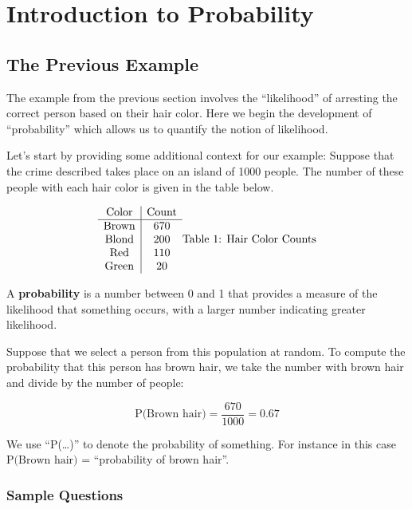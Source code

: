 \documentclass[
]{book}
\begin{document}
\hypertarget{introduction-to-probability}{%
\chapter{Introduction to Probability}\label{introduction-to-probability}}

\hypertarget{the-previous-example}{%
\section{The Previous Example}\label{the-previous-example}}

The example from the previous section involves the ``likelihood'' of arresting the
correct person based on their hair color. Here we begin the development of
``probability'' which allows us to quantify the notion of likelihood.

Let's start by providing some additional context for our example:
Suppose that the crime described takes place on an island of 1000 people.
The number of these people with each hair color is given in the table below.

\[
\begin{array}{c|c}
 \mathrm{Color} & \mathrm{Count} \\ \hline
\mathrm{Brown} & 670  \\ 
\mathrm{Blond} & 200  \\ 
\mathrm{Red} & 110  \\ 
\mathrm{Green} & 20  \\ 
\end{array}\\
\mbox{Table 1: Hair Color Counts}
\]

A \textbf{probability} is a number between 0 and 1 that provides a measure of the
likelihood that something occurs,
with a larger number indicating greater likelihood.

Suppose that we select a person from this population at random. To compute
the probability that this person has brown hair,
we take the number with brown hair and divide by the number of people:

\[\mbox{P(Brown hair)} = \frac{670}{1000} = 0.67\]

We use ``P(\ldots)'' to denote the probability of something. For instance in this case
\(\mbox{P(Brown hair)}\) = ``probability of brown hair''.

\hypertarget{sample-questions}{%
\subsection{Sample Questions}\label{sample-questions}}
\end{document}
